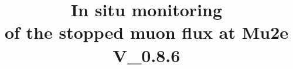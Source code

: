 \documentclass[12pt,a4paper,openright, oneside, titlepage]{book} %
\title{In situ monitoring\\ of the stopped muon flux at Mu2e\\\textbf{V\_0.8.6}}
\begin{document}
\frontmatter

\maketitle
\end{document}
